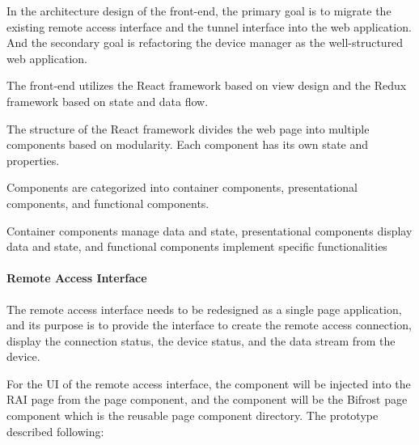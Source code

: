 In the architecture design of the front-end, the primary goal is to migrate the existing 
remote access interface and the tunnel interface into the web application.
And the secondary goal is refactoring the device manager as the well-structured web application.

The front-end utilizes the React framework based on view design and the Redux framework 
based on state and data flow.

The structure of the React framework divides the web page into multiple components 
based on modularity. Each component has its own state and properties.

Components are categorized into container components, presentational components, 
and functional components.

Container components manage data and state, presentational components display data 
and state, and functional components implement specific functionalities

\paragraph{Remote Access Interface}

The remote access interface needs to be redesigned as a single page application, 
and its purpose is to provide the interface to create the remote access connection, 
display the connection status, the device status, and the data stream from the device.

For the UI of the remote access interface, the component will be injected into the RAI page 
from the page component, and the component will be the Bifrost page component which is 
the reusable page component directory.  
The prototype described following:

